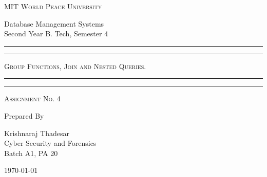 \documentclass[11pt]{article}
\begin{document}
\begin{titlepage}
	\centering


	\huge\textsc{
		MIT World Peace University
	}\\

	\vspace{0.75\baselineskip} %

	\LARGE{
		Database Management Systems\\
		Second Year B. Tech, Semester 4
	}

	\vfill %


	\rule{\textwidth}{1.6pt}\vspace*{-\baselineskip}\vspace*{2pt}
	\rule{\textwidth}{0.6pt}
	\vspace{0.75\baselineskip} %



	\huge{\textsc{
			Group Functions, Join and Nested Queries.
		}} \\



	\vspace{0.5\baselineskip} %
	\rule{\textwidth}{0.6pt}\vspace*{-\baselineskip}\vspace*{2.8pt}
	\rule{\textwidth}{1.6pt}

	\vspace{1\baselineskip} %


	\LARGE\textsc{
		Assignment No. 4
	} %
	\vfill


	Prepared By
	\vspace{0.5\baselineskip} %

	\Large{
		Krishnaraj Thadesar \\
		Cyber Security and Forensics\\
		Batch A1, PA 20
	}


	\vspace{0.5\baselineskip} %
	\today

\end{titlepage}
\end{document}

